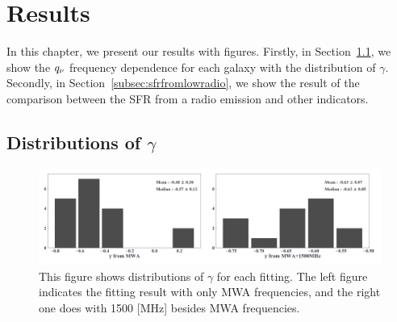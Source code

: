\chapter{Results}\label{chap:results}
\begin{chapabstract}

In this chapter, we present our results with figures.
Firstly, in Section~\ref{subsec:GammaDistribution}, we show the $q_{\nu}$ frequency dependence for each galaxy with the distribution of $\gamma$.
Secondly, in Section~\ref{subsec:sfrfromlowradio}, we show the result of the comparison between the SFR from a radio emission and other indicators.

\end{chapabstract}




\section{Distributions of $\gamma$}\label{subsec:GammaDistribution}

\begin{figure}[htbp]
	\centering
	\includegraphics[width=\linewidth]{Chapter_5/Figures/Result_comparehist.pdf}
    \caption[Histograms of $\gamma$ from the fitting]{\label{fig:comparehist}
        This figure shows distributions of $\gamma$ for each fitting.
        The left figure indicates the fitting result with only MWA frequencies, and the right one does with 1500 [MHz] besides MWA frequencies.
    }
\end{figure}

